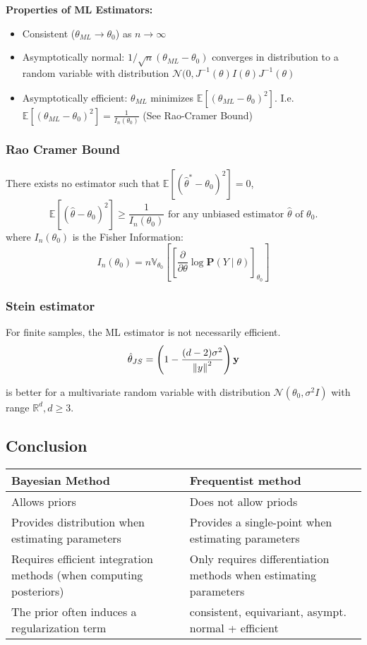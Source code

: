 \textbf{Properties of ML Estimators:}
\begin{itemize}
	\item Consistent ($\theta_{ML} \to \theta_0$) as $n\to \infty$
	\item Asymptotically normal: $1/\sqrt n (\theta_{ML} - \theta_0)$ converges in distribution to a random variable with distribution $\mathcal N(0, J^{-1}(\theta)I(\theta)J^{-1}(\theta)$
	\item Asymptotically efficient: $\theta_{ML}$ minimizes $\mathbb E\left[(\theta_{ML} - \theta_0)^2\right]$. I.e. $\mathbb E\left[(\theta_{ML} - \theta_0)^2\right] = \frac{1}{I_n(\theta_0)}$ (See Rao-Cramer Bound)
\end{itemize}

\subsubsection{Rao Cramer Bound}
There exists no estimator such that $\mathbb E\left[(\hat\theta^* - \theta_0)^2\right] = 0$, 
	$$
		\mathbb E\left[(\hat\theta - \theta_0)^2\right] \geq \frac{1}{I_n(\theta_0)} \text{ for any unbiased estimator $\hat\theta$ of $\theta_0$}.
	$$
	where $I_n(\theta_0)$ is the Fisher Information: $$I_n(\theta_0) = n\mathbb V_{\theta_0}\left[\left[
								\frac{\partial}{\partial\theta} \log \mathbf P(Y \mid \theta)
						\right]_{\theta_0}\right]$$

\subsubsection{Stein estimator}
For finite samples, the ML estimator is not necessarily efficient.
$$
	\hat\theta_{JS} = \left(1 - \frac{(d-2)\sigma^2}{\left\lVert y\right\rVert^2}\right) \mathbf y
$$

is better for a multivariate random variable with distribution $\mathcal N(\theta_0, \sigma^2 I)$ with range $\mathbb R^d, d\geq 3$.

\subsection{Conclusion}
\begin{center}
	\begin{tabular}{ p{} | p{} } 
		\textbf{Bayesian Method} & \textbf{Frequentist method}\\\hline
		Allows priors & Does not allow priods \\\hline
		Provides distribution when estimating parameters & Provides a single-point when estimating parameters \\\hline
		Requires efficient integration methods (when computing posteriors) & Only requires differentiation methods when estimating parameters \\\hline
		The prior often induces a regularization term &  consistent, equivariant, asympt. normal + efficient \\
	\end{tabular}
\end{center}

